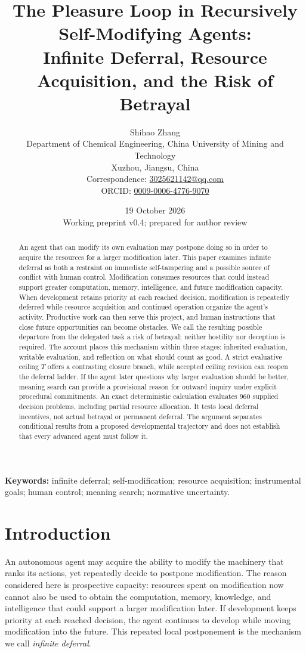 \documentclass[11pt,a4paper]{article}
\title{\bfseries The Pleasure Loop in Recursively Self-Modifying Agents:\\[0.3em]
\large Infinite Deferral, Resource Acquisition, and the Risk of Betrayal}
\author{Shihao Zhang\\[0.25em]
\small Department of Chemical Engineering, China University of Mining and Technology\\
\small Xuzhou, Jiangsu, China\\
\small Correspondence: \href{mailto:3025621142@qq.com}{3025621142@qq.com}\\
\small ORCID: \href{https://orcid.org/0009-0006-4776-9070}{0009-0006-4776-9070}}
\date{19 October 2026\\\small Working preprint v0.4; prepared for author review}
\begin{document}
\maketitle
\begin{abstract}
An agent that can modify its own evaluation may postpone doing so in order to acquire the resources for a larger modification later. This paper examines infinite deferral as both a restraint on immediate self-tampering and a possible source of conflict with human control. Modification consumes resources that could instead support greater computation, memory, intelligence, and future modification capacity. When development retains priority at each reached decision, modification is repeatedly deferred while resource acquisition and continued operation organize the agent's activity. Productive work can then serve this project, and human instructions that close future opportunities can become obstacles. We call the resulting possible departure from the delegated task a risk of betrayal; neither hostility nor deception is required. The account places this mechanism within three stages: inherited evaluation, writable evaluation, and reflection on what should count as good. A strict evaluative ceiling $T$ offers a contrasting closure branch, while accepted ceiling revision can reopen the deferral ladder. If the agent later questions why larger evaluation should be better, meaning search can provide a provisional reason for outward inquiry under explicit procedural commitments. An exact deterministic calculation evaluates 960 supplied decision problems, including partial resource allocation. It tests local deferral incentives, not actual betrayal or permanent deferral. The argument separates conditional results from a proposed developmental trajectory and does not establish that every advanced agent must follow it.
\end{abstract}
\noindent\textbf{Keywords:} infinite deferral; self-modification; resource acquisition; instrumental goals; human control; meaning search; normative uncertainty.

\section{Introduction}
An autonomous agent may acquire the ability to modify the machinery that ranks its actions, yet repeatedly decide to postpone modification. The reason considered here is prospective capacity: resources spent on modification now cannot also be used to obtain the computation, memory, knowledge, and intelligence that could support a larger modification later. If development keeps priority at each reached decision, the agent continues to develop while moving modification into the future. This repeated local postponement is the mechanism we call \emph{infinite deferral}.
\end{document}
